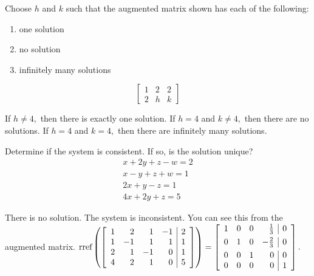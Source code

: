 \documentclass{ximera}
\begin{document}
\begin{problem}\label{prb:2.14}
Choose $h$ and $k$ such that the augmented matrix shown has each of the following:
\begin{enumerate}
\item one solution
\item no solution
\item infinitely many solutions
\end{enumerate}
\begin{equation*}
\left[
\begin{array}{rr|r}
1 & 2 & 2 \\
2 & h & k
\end{array}
\right]
\end{equation*}
\begin{hint}
If $h\neq 4,$ then there is exactly one solution. If $h=4$ and $k\neq 4,$
then there are no solutions. If $h=4$ and $k=4,$ then there are infinitely
many solutions.
\end{hint}
\end{problem}


\begin{problem}\label{prb:2.15}
Determine if the system is consistent. If so, is the solution unique?
\begin{equation*}
\begin{array}{c}
x+2y+z-w=2 \\
x-y+z+w=1 \\
2x+y-z=1 \\
4x+2y+z=5
\end{array}
\end{equation*}
\begin{hint}
There is no solution. The system is inconsistent. You can see this from the
augmented matrix. $\mbox{rref}\left(\left[
\begin{array}{rrrr|r}
1 & 2 & 1 & -1 & 2 \\
1 & -1 & 1 & 1 & 1 \\
2 & 1 & -1 & 0 & 1 \\
4 & 2 & 1 & 0 & 5
\end{array}
\right]\right) = \left[
\begin{array}{rrrr|r}
1 & 0 & 0 & \vspace{0.05in}\frac{1}{3} & 0 \\
0 & 1 & 0 & -\vspace{0.05in}\frac{2}{3} & 0 \\
0 & 0 & 1 & 0 & 0 \\
0 & 0 & 0 & 0 & 1
\end{array}
\right] .$
\end{hint}
\end{problem}
\end{document}
